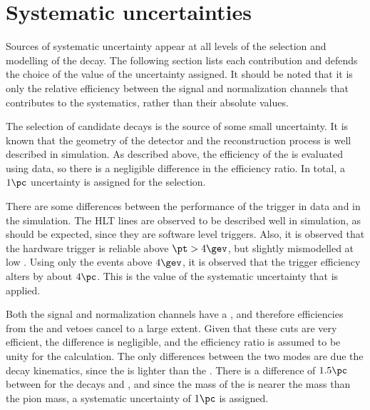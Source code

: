 \section{Systematic uncertainties}
\label{sec:dsphi:syst}

Sources of systematic uncertainty appear at all levels of the selection and modelling of the decay.
The following section lists each contribution and defends the choice of the value of the
uncertainty assigned.
It should be noted that it is only the relative efficiency between the signal and normalization
channels that contributes to the systematics, rather than their absolute values.

The selection of candidate \btodsphi decays is the source of some small uncertainty.
It is known that the geometry of the detector and the reconstruction process is well described in
simulation.
As described above, the efficiency of the \bdt is evaluated using data, so there is a negligible
difference in the efficiency ratio.
In total, a $1\pc$ uncertainty is assigned for the selection.

There are some differences between the performance of the trigger in data and in the simulation.
The HLT lines are observed to be described well in simulation, as should be expected, since they
are software level triggers.
Also, it is observed that the \lone hardware trigger is reliable above $\pt>4\gev$, but slightly
mismodelled at low \pt.
Using only the events above $4\gev$, it is observed that the trigger efficiency alters by about
$4\pc$.
This is the value of the systematic uncertainty that is applied.

Both the signal and normalization channels have a \Ds, and therefore efficiencies from the \Dp and
\Lc vetoes cancel to a large extent.
Given that these cuts are very efficient, the difference is negligible, and the efficiency ratio is
assumed to be unity for the calculation.
The only differences between the two modes are due the decay kinematics, since the \phii is lighter
than the \Dz.
There is a difference of $1.5\pc$ between  for the decays \decay{\Bsb}{\Dsp\pim} and
\btodsd, and
since the mass of the \phii is nearer the \Dz mass than the pion mass, a systematic uncertainty of
$1\pc$ is assigned.


